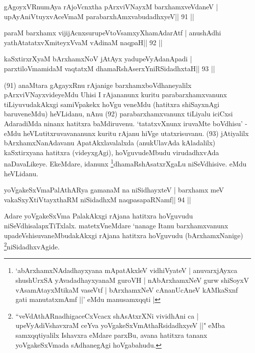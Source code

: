\begin{shl}
gAgoyxVR\s numAya rAjoVcnx\s tha pArxviVNayxM barxhamxveVdaneV |
upAyAniVtuyxvAceVmaM parabarxhAmxvabudadhxyeV\hfill || 91 ||
\end{shl}

\begin{shl}
paraM barxhamx vijijAcnxsurupeVtoV\s samxyXhamAdarAtf |
anushAdhi yathAtatatxvXmiteyxVvaM vAdinaM naqpaH\hfill || 92 ||
\end{shl}

\begin{shl}
kaSxtirxrXyaM bArxhamxNoV jAtAyx yadupeVyAdanApadi |
parxtiloVmamidaM vaqtatxM dhamaRshAserxYniRSidadhxtaH\hfill || 93 ||
\end{shl}

\begin{artha}
(91) anaMtara gAgayxRnu rAjanige barxhamxboVdhaneyalilx pArxviVNayxvideyeMdu Uhisi I rAjananunx kuritu parabarxhamxvanunx tiLiyuvudakAkxgi samiVpakekx hoVgu veneMdu (hatitxra shiSayxnAgi baruveneMdu) heVLidanu, nAnu (92) parabarxhamxvanunx tiLiyalu iciCxsi AdaradiMda ninanx hatitxra baMdiruvenu. `tatatxvXnunx iruvaMte boVdhisu' - eMdu heVLutitxruvavananunx kuritu rAjanu hiVge utatxrisuvanu. (93) jAtiyalilx bArxhamxNanAdavanu ApatAkxlavalalxda (anukUlavAda kAladalilx) kaSxtirxyana hatitxra (videyxgAgi), hoVguvudeMbudu virudadhxvAda naDavaLikeye. EkeMdare, idanunx \footnote{`abArxhamxNAdadhayxyana mApatAkxleV vidhiVyateV | anuvarxjAyxca shushUrxSA yAvadadhayxyanaM guroVH | nAbArxhamxNeV gurw shiSoyxV vAsamAtayxMtikaM vaseVtf | bArxhamxNeV cAnanUcAneV kAMkaSxnf gati manutatxmAmf ||' eMdu manusamxqqti |}dhamaRshAsatxrXgaLu niSeVdhisive. eMdu heVLidanu.
\end{artha} 

\begin{shl}
yoVgakeSxVmaPalAthARya gamanaM na niSidhayxteV |
barxhamx meV vakaSxyXtiVtayxthaRM niSidadhxM naqpasapaRNamf\hfill || 94 ||
\end{shl}

\begin{artha}
Adare yoVgakeSxVma PalakAkxgi rAjana hatitxra hoVguvudu 
niSeVdhisalapxTiTxlalx. matetxVneMdare `nanage Itanu barxhamxvanunx 
upadeVshisuvaneMbudakAkxgi rAjana hatitxra hoVguvudu (bArxhamxNanige) 
\footnote{``veVdAthARnadhigaceCxVcacx shAsAtxrXNi vividhAni ca | 
upeVyAdiVshavxraM ceYva yoVgakeSxVmAthaRsidadhxyeV ||" eMba samxqqtiyalilx Ishavxra eMdare parxBu, avana hatitxra tananx yoVgakeSxVmada sAdhanegAgi hoVgabahudu.}niSidadhxvAgide.
\end{artha}

